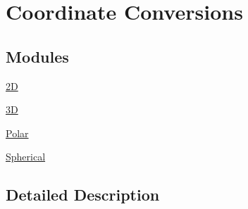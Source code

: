 \hypertarget{group___e_g_x_math-_conversions-_coordinate_conversions}{}\section{Coordinate Conversions}
\label{group___e_g_x_math-_conversions-_coordinate_conversions}
\subsection*{Modules}
\begin{DoxyCompactItemize}
\item 
\mbox{\hyperlink{group___e_g_x_math-_conversions-_coordinate_conversions-2_d}{2D}}
\item 
\mbox{\hyperlink{group___e_g_x_math-_conversions-_coordinate_conversions-3_d}{3D}}
\item 
\mbox{\hyperlink{group___e_g_x_math-_conversions-_coordinate_conversions-_polar}{Polar}}
\item 
\mbox{\hyperlink{group___e_g_x_math-_conversions-_coordinate_conversions-_spherical}{Spherical}}
\end{DoxyCompactItemize}


\subsection{Detailed Description}
